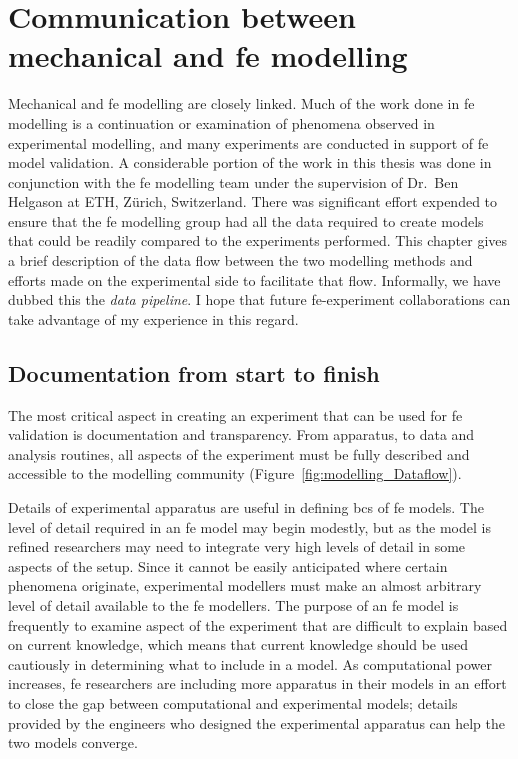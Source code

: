 \chapter{Communication between mechanical and \acl*{fe} modelling}
\label{ch:modelling}
Mechanical and \acf{fe} modelling are closely linked.
Much of the work done in \ac{fe} modelling is a continuation or examination of phenomena observed in experimental modelling, and many experiments are conducted in support of \ac{fe} model validation.
A considerable portion of the work in this thesis was done in conjunction with the \ac{fe} modelling team under the supervision of Dr.\ Ben Helgason at ETH, Z\"{u}rich, Switzerland.
There was significant effort expended to ensure that the \ac{fe} modelling group had all the data required to create models that could be readily compared to the experiments performed.
This chapter gives a brief description of the data flow between the two modelling methods and efforts made on the experimental side to facilitate that flow.
Informally, we have dubbed this the \textit{data pipeline}.
I hope that future \ac{fe}-experiment collaborations can take advantage of my experience in this regard.

\section{Documentation from start to finish}
\label{sec:modelling_document}
The most critical aspect in creating an experiment that can be used for \ac{fe} validation is documentation and transparency.
From apparatus, to data and analysis routines, all aspects of the experiment must be fully described and accessible to the modelling community (Figure~\ref{fig:modelling_Dataflow}).

Details of experimental apparatus are useful in defining \acfp{bc} of \ac{fe} models.
The level of detail required in an \ac{fe} model may begin modestly, but as the model is refined researchers may need to integrate very high levels of detail in some aspects of the setup.
Since it cannot be easily anticipated where certain phenomena originate, experimental modellers must make an almost arbitrary level of detail available to the \ac{fe} modellers.
The purpose of an \ac{fe} model is frequently to examine aspect of the experiment that are difficult to explain based on current knowledge, which means that current knowledge should be used cautiously in determining what to include in a model.
As computational power increases, \ac{fe} researchers are including more apparatus in their models in an effort to close the gap between computational and experimental models; details provided by the engineers who designed the experimental apparatus can help the two models converge.


